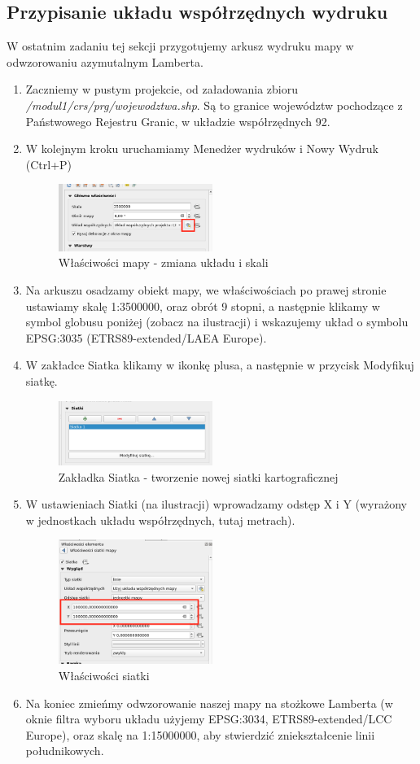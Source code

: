 \documentclass[a4paper,11pt, onecolumn, openany]{memoir}
\begin{document}
	\subsection{Przypisanie układu współrzędnych wydruku}
	W ostatnim zadaniu tej sekcji przygotujemy arkusz wydruku mapy w odwzorowaniu azymutalnym Lamberta.
	\begin{enumerate}
		\item Zaczniemy w pustym projekcie, od załadowania zbioru \emph{/modul1/crs/prg/wojewodztwa.shp}. Są to granice województw pochodzące z Państwowego Rejestru Granic, w układzie współrzędnych 92.
		\item W kolejnym kroku uruchamiamy Menedżer wydruków i Nowy Wydruk (Ctrl+P)
		\begin{figure}[!ht]
			\centering
			\includegraphics[width=5cm]{crs-wydruk-laea}
			\caption{Właściwości mapy - zmiana układu i skali}
		\end{figure}
		\item Na arkuszu osadzamy obiekt mapy, we właściwościach po prawej stronie ustawiamy skalę 1:3500000, oraz obrót 9 stopni, a następnie klikamy w symbol globusu poniżej (zobacz na ilustracji) i wskazujemy układ o symbolu EPSG:3035 (ETRS89-extended/LAEA Europe).
		\item W zakładce Siatka klikamy w ikonkę plusa, a następnie w przycisk Modyfikuj siatkę.
		\begin{figure}[!ht]
			\centering
			\includegraphics[width=5cm]{crs-laea-siatka}
			\caption{Zakładka Siatka - tworzenie nowej siatki kartograficznej}
		\end{figure}
		\item W ustawieniach Siatki (na ilustracji) wprowadzamy odstęp X i Y (wyrażony w jednostkach układu współrzędnych, tutaj metrach).
		\begin{figure}[!ht]
			\centering
			\includegraphics[width=5cm]{crs-laea-linie-siatki}
			\caption{Właściwości siatki}
		\end{figure}
		\item Na koniec zmieńmy odwzorowanie naszej mapy na stożkowe Lamberta (w oknie filtra wyboru układu użyjemy EPSG:3034, ETRS89-extended/LCC Europe), oraz skalę na 1:15000000, aby stwierdzić zniekształcenie linii południkowych.
	\end{enumerate} 
\end{document}

